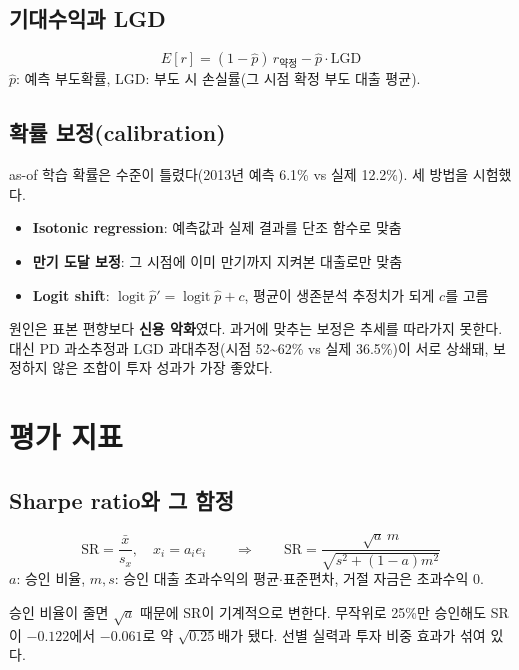 \documentclass[11pt]{report}
\begin{document}
\section{기대수익과 LGD}
\begin{formulabox}[연 기대수익(근사)]
\[ E[r]=(1-\hat p)\,r_{\text{약정}}-\hat p\cdot\mathrm{LGD} \]
$\hat p$: 예측 부도확률, LGD: 부도 시 손실률(그 시점 확정 부도 대출 평균).
\end{formulabox}

\section{확률 보정(calibration)}
as-of 학습 확률은 수준이 틀렸다(2013년 예측 6.1\% vs 실제 12.2\%). 세 방법을 시험했다.
\begin{itemize}
\item \textbf{Isotonic regression}: 예측값과 실제 결과를 단조 함수로 맞춤
\item \textbf{만기 도달 보정}: 그 시점에 이미 만기까지 지켜본 대출로만 맞춤
\item \textbf{Logit shift}: $\operatorname{logit}\hat p'=\operatorname{logit}\hat p+c$, 평균이 생존분석 추정치가 되게 $c$를 고름
\end{itemize}
\begin{warnbox}[결과: 모두 실패]
원인은 표본 편향보다 \textbf{신용 악화}였다. 과거에 맞추는 보정은 추세를 따라가지 못한다. 대신 PD 과소추정과 LGD 과대추정(시점 52\textasciitilde 62\% vs 실제 36.5\%)이 서로 상쇄돼, 보정하지 않은 조합이 투자 성과가 가장 좋았다.
\end{warnbox}

\chapter{평가 지표}

\section{Sharpe ratio와 그 함정}
\begin{formulabox}
\[ \mathrm{SR}=\frac{\bar x}{s_x},\quad x_i=a_i e_i \qquad\Longrightarrow\qquad
\mathrm{SR}=\frac{\sqrt a\, m}{\sqrt{s^2+(1-a)m^2}} \]
$a$: 승인 비율, $m,s$: 승인 대출 초과수익의 평균\ensuremath{\cdot}표준편차, 거절 자금은 초과수익 0.
\end{formulabox}
\begin{whybox}[역U자의 정체]
승인 비율이 줄면 $\sqrt a$ 때문에 SR이 기계적으로 변한다. 무작위로 25\%만 승인해도 SR이 $-0.122$에서 $-0.061$로 약 $\sqrt{0.25}$배가 됐다. 선별 실력과 투자 비중 효과가 섞여 있다.
\end{whybox}
\end{document}

